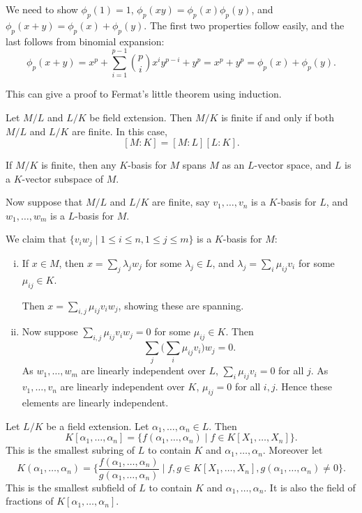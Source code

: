 \documentclass[12pt]{article}
\begin{document}
\begin{proofbox}
We need to show $\phi_p(1) = 1$, $\phi_p(xy) = \phi_p(x) \phi_p(y)$, and $\phi_p(x+y) = \phi_p(x) + \phi_p(y)$. The first two properties follow easily, and the last follows from binomial expansion:
	\[
		\phi_p(x+y) = x^{p} + \sum_{i = 1}^{p-1} \binom{p}{i} x^{i} y^{p-i} + y^{p} = x^{p} + y^{p} = \phi_p(x) + \phi_p(y)
	.\]
\end{proofbox}

This can give a proof to Fermat's little theorem using induction.

\begin{theorem}
	Let $M/L$ and $L/K$ be field extension. Then $M/K$ is finite if and only if both $M/L$ and $L/K$ are finite. In this case,
	\[
		[M:K] = [M:L][L:K].
	\]
	
\end{theorem}

\begin{proofbox}
	If $M/K$ is finite, then any $K$-basis for $M$ spans $M$ as an $L$-vector space, and $L$ is a $K$-vector subspace of $M$.

	Now suppose that $M/L$ and $L/K$ are finite, say $v_1, \ldots, v_n$ is a $K$-basis for $L$, and $w_1, \ldots, w_m$ is a $L$-basis for $M$.

	We claim that $\{v_iw_j \mid 1 \leq i \leq n, 1 \leq j \leq m\}$ is a $K$-basis for $M$:
	\begin{enumerate}[(i)]
		\item If $x \in M$, then $x = \sum_j \lambda_j w_j$ for some $\lambda_j \in L$, and $\lambda_j = \sum_i \mu_{ij} v_i$ for some $\mu_{ij} \in K$.

			Then $x = \sum_{i,j} \mu_{ij} v_i w_j$, showing these are spanning.
		\item Now suppose $\sum_{i,j} \mu_{ij} v_i w_j = 0$ for some $\mu_{ij} \in K$. Then
			\[
			\sum_j \Biggl( \sum_i \mu_{ij} v_i \Biggr) w_j = 0.
			\]
			As $w_1, \ldots, w_m$ are linearly independent over $L$, $\sum_i \mu_{ij} v_i = 0$ for all $j$. As $v_1, \ldots, v_n$ are linearly independent over $K$, $\mu_{ij} = 0$ for all $i, j$. Hence these elements are linearly independent.
	\end{enumerate}
\end{proofbox}

\begin{definition}
	Let $L/K$ be a field extension. Let $\alpha_1, \ldots, \alpha_n \in L$. Then
	\[
		K[\alpha_1, \ldots, \alpha_n] = \{f(\alpha_1, \ldots, \alpha_n) \mid f \in K[X_1,\ldots, X_n]\}.
	\]
	This is the smallest subring of $L$ to contain $K$ and $\alpha_1, \ldots, \alpha_n$. Moreover let
	\[
		K(\alpha_1, \ldots, \alpha_n) = \biggl\{ \frac{f(\alpha_1, \ldots, \alpha_n)}{g(\alpha_1, \ldots, \alpha_n)} \mid f, g \in K[X_1, \ldots, X_n], g(\alpha_1, \ldots, \alpha_n) \neq 0\}.
	\]
	This is the smallest subfield of $L$ to contain $K$ and $\alpha_1, \ldots, \alpha_n$. It is also the field of fractions of $K[\alpha_1, \ldots, \alpha_n]$.
\end{definition}
\end{document}

